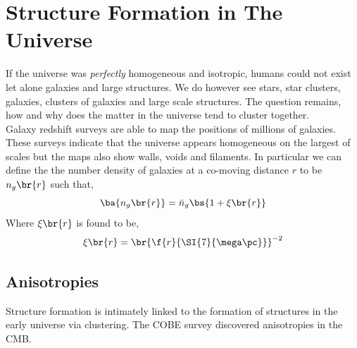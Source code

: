 \documentclass{article}
\begin{document}
\section{Structure Formation in The Universe}

If the universe was \textit{perfectly} homogeneous and isotropic, humans could not exist let alone galaxies and large structures. We do however see stars, star clusters, galaxies, clusters of galaxies and large scale structures. The question remains, how and why does the matter in the universe tend to cluster together.\\

Galaxy redshift surveys are able to map the positions of millions of galaxies. These surveys indicate that the universe appears homogeneous on the largest of scales but the maps also show walls, voids and filaments. In particular we can define the the number density of galaxies at a co-moving distance $r$ to be $n_g\br{r}$ such that,
\[ \ba{n_g\br{r}} = \bar n_g \bs{1 + \xi\br{r}} \]
Where $\xi\br{r}$ is found to be,
\[ \xi\br{r} = \br{\f{r}{\SI{7}{\mega\pc}}}^{-2} \]

\subsection{Anisotropies}

Structure formation is intimately linked to the formation of structures in the early universe via clustering. The COBE survey discovered anisotropies in the CMB. \\
\end{document}
